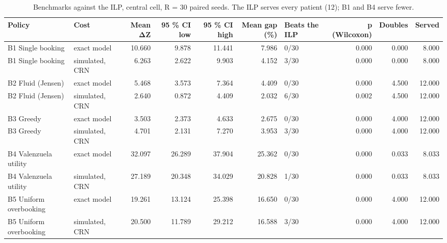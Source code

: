\begin{table}[htbp]
\caption{Benchmarks against the ILP, central cell, R = 30 paired seeds. The ILP serves every patient (12); B1 and B4 serve fewer.}
\label{tab:benchmarks}
\begin{tabular}{llrrrrlrrr}
\toprule
Policy & Cost & Mean ΔZ & 95 \% CI low & 95 \% CI high & Mean gap (\%) & Beats the ILP & p (Wilcoxon) & Doubles & Served \\
\midrule
B1 Single booking & exact model & 10.660 & 9.878 & 11.441 & 7.986 & 0/30 & 0.000 & 0.000 & 8.000 \\
B1 Single booking & simulated, CRN & 6.263 & 2.622 & 9.903 & 4.152 & 3/30 & 0.000 & 0.000 & 8.000 \\
B2 Fluid (Jensen) & exact model & 5.468 & 3.573 & 7.364 & 4.409 & 0/30 & 0.000 & 4.500 & 12.000 \\
B2 Fluid (Jensen) & simulated, CRN & 2.640 & 0.872 & 4.409 & 2.032 & 6/30 & 0.002 & 4.500 & 12.000 \\
B3 Greedy & exact model & 3.503 & 2.373 & 4.633 & 2.675 & 0/30 & 0.000 & 4.000 & 12.000 \\
B3 Greedy & simulated, CRN & 4.701 & 2.131 & 7.270 & 3.953 & 3/30 & 0.000 & 4.000 & 12.000 \\
B4 Valenzuela utility & exact model & 32.097 & 26.289 & 37.904 & 25.362 & 0/30 & 0.000 & 0.033 & 8.033 \\
B4 Valenzuela utility & simulated, CRN & 27.189 & 20.348 & 34.029 & 20.828 & 1/30 & 0.000 & 0.033 & 8.033 \\
B5 Uniform overbooking & exact model & 19.261 & 13.124 & 25.398 & 16.650 & 0/30 & 0.000 & 4.000 & 12.000 \\
B5 Uniform overbooking & simulated, CRN & 20.500 & 11.789 & 29.212 & 16.588 & 3/30 & 0.000 & 4.000 & 12.000 \\
\bottomrule
\end{tabular}
\end{table}
